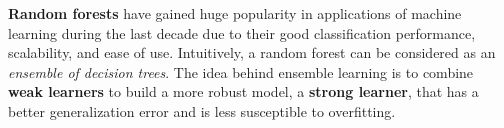 \documentclass{article}
\begin{document}


\textbf{Random forests} have gained huge popularity in applications of machine learning during the last decade due to their good classification performance, scalability, and ease of use. Intuitively, a random forest can be considered as an \textit{ensemble of decision trees}. The idea behind ensemble learning is to combine \textbf{weak learners} to build a more robust model, a \textbf{strong learner}, that has a better generalization error and is less susceptible to overfitting. 







\end{document}
